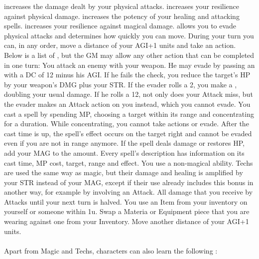  increases the damage dealt by your physical attacks. \ofrow
{} increases your resilience against physical damage. \ofrow
{} increases the potency of your healing and attacking spells. \ofrow
{} increases your resilience against magical damage. \ofrow
{} allows you to evade physical attacks and determines how quickly you can move.
%
\newpage
%
During your turn you can, in any order, move a distance of your AGI+1 units and take an action.
Below is a list of , but the GM may allow any other action that can be completed in one turn:\ofgap
%
You attack an enemy with your weapon. 
He may evade by passing an  with a DC of 12 minus his AGI. 
If he fails the check, you reduce the target's HP by your weapon's DMG plus your STR.
If the evader rolls a 2, you make a , doubling your usual damage. 
If he rolls a 12, not only does your Attack miss, but the evader makes an Attack action on you instead, which you cannot evade.\ofgap
%
You cast a spell by spending MP, choosing a target within its range and concentrating for a duration.
While concentrating, you cannot take actions or evade. 
After the cast time is up, the spell's effect occurs on the target right  and cannot be evaded even if you are not in range anymore.
If the spell deals damage or restores HP, add your MAG to the amount.
Every spell's description has information on its cast time, MP cost, target, range and effect.\ofgap
%
You use a non-magical ability. 
Techs are used the same way as magic, but their damage and healing is amplified by your STR instead of your MAG, 
except if their use already includes this bonus in another way, for example by involving an Attack.\ofgap
%
 All damage that you receive by Attacks until your next turn is halved. \ofgap
%
 You use an Item from your inventory on yourself or someone within 1u.\ofgap
%
 Swap a Materia or Equipment piece that you are wearing against one from your Inventory.\ofgap
%
 Move another distance of your AGI+1 units.\\\\
%
Apart from Magic and Techs, characters can also learn the following : \ofrow
